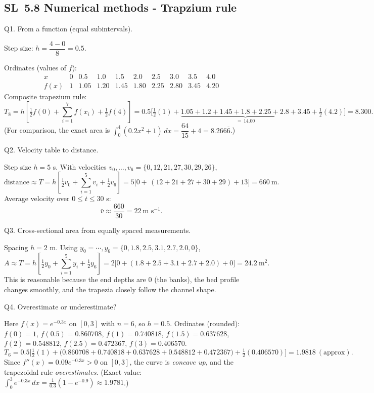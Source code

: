 \documentclass[11pt]{article}
\def\textbf#1{#1}%
\newcommand{\tocsubsection}[1]{\subsection{#1}}
\begin{document}

\tocsubsection{SL 5.8 \; Numerical methods - Trapzium rule}


\begin{solution}
\textbf{Q1. From a function (equal subintervals).}

Step size: \(h=\dfrac{4-0}{8}=0.5\).

Ordinates (values of \(f\)):
\[
\begin{array}{c|ccccccccc}
x      & 0   & 0.5 & 1.0 & 1.5 & 2.0 & 2.5 & 3.0 & 3.5 & 4.0\\ \hline
f(x)   & 1   & 1.05& 1.20& 1.45& 1.80& 2.25& 2.80& 3.45& 4.20
\end{array}
\]
Composite trapezium rule:
\[
T_8
= h\!\left[\tfrac12 f(0)+\sum_{i=1}^{7} f(x_i)+\tfrac12 f(4)\right]
=0.5\Big[\tfrac12(1)+\underbrace{1.05+1.2+1.45+1.8+2.25+2.8+3.45}_{=\,14.00}
+\tfrac12(4.2)\Big]
= \boxed{8.300}.
\]
(For comparison, the exact area is \(\int_0^4 (0.2x^2+1)\,dx=\dfrac{64}{15}+4=8.266\overline{6}\).)
\end{solution}

\begin{solution}
\textbf{Q2. Velocity table to distance.}

Step size \(h=5\) s.  With velocities \(v_0,\ldots,v_6=\{0,12,21,27,30,29,26\}\),
\[
\text{distance}\approx T
= h\!\left[\tfrac12 v_0+\sum_{i=1}^{5} v_i+\tfrac12 v_6\right]
= 5\Big[0+\,(12+21+27+30+29)+13\Big]
= \boxed{660\ \text{m}}.
\]
Average velocity over \(0\le t\le 30\) s:
\[
\bar v \approx \frac{660}{30}=\boxed{22\ \text{m s}^{-1}}.
\]
\end{solution}

\begin{solution}
\textbf{Q3. Cross-sectional area from equally spaced measurements.}

Spacing \(h=2\) m.  Using \(y_0=\cdots,y_6=\{0,1.8,2.5,3.1,2.7,2.0,0\}\),
\[
A \approx T
= h\!\left[\tfrac12 y_0+\sum_{i=1}^{5} y_i+\tfrac12 y_6\right]
= 2\big[0+(1.8+2.5+3.1+2.7+2.0)+0\big]
= \boxed{24.2\ \text{m}^2 }.
\]
This is reasonable because the end depths are \(0\) (the banks), the bed profile changes smoothly, and the trapezia closely follow the channel shape.
\end{solution}

\begin{solution}
\textbf{Q4. Overestimate or underestimate?}

Here \(f(x)=e^{-0.3x}\) on \([0,3]\) with \(n=6\), so \(h=0.5\).
Ordinates (rounded): \(f(0)=1\), \(f(0.5)=0.860708\), \(f(1)=0.740818\), \(f(1.5)=0.637628\),
\(f(2)=0.548812\), \(f(2.5)=0.472367\), \(f(3)=0.406570\).
\[
T_6
= 0.5\!\Big[\tfrac12(1)+\big(0.860708+0.740818+0.637628+0.548812+0.472367\big)+\tfrac12(0.406570)\Big]
= \boxed{1.9818}\ (\text{approx}).
\]
Since \(f''(x)=0.09e^{-0.3x}>0\) on \([0,3]\), the curve is \emph{concave up}, and the trapezoidal rule \emph{overestimates}.  
(Exact value: \(\int_0^3 e^{-0.3x}\,dx=\tfrac{1}{0.3}(1-e^{-0.9})\approx 1.9781\).)
\end{solution}
\end{document}

